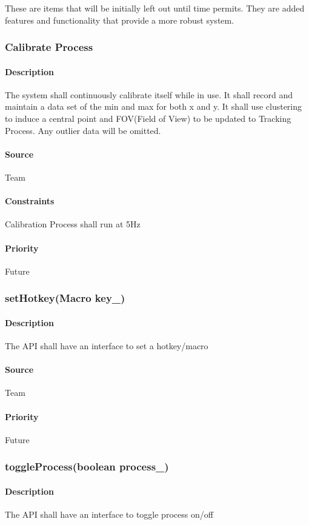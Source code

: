 These are items that will be initially left out until time permits.  They are added features and functionality that provide a more robust system.
\subsubsection{Calibrate Process}
\paragraph{Description}
The system shall continuously calibrate itself while in use.  It shall record and maintain a data set of the min and max for both x and y.  It shall use clustering to induce a central point and FOV(Field of View) to be updated to Tracking Process.  Any outlier data will be omitted.
\paragraph{Source}
Team
\paragraph{Constraints}
Calibration Process shall run at 5Hz
\paragraph{Priority}
Future
\subsubsection{setHotkey(Macro key\_)}
\paragraph{Description}
The API shall have an interface to set a hotkey/macro
\paragraph{Source}
Team
\paragraph{Priority}
Future
\subsubsection{toggleProcess(boolean process\_)}
\paragraph{Description}
The API shall have an interface to toggle process on/off
